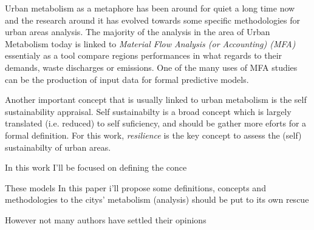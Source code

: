 Urban metabolism as a metaphore has been around for quiet a long time now    
and the research around it has evolved towards some specific methodologies for urban areas analysis.
The majority of the analysis in the area of Urban Metabolism today is 
linked to \emph{Material Flow Analysis (or Accounting) (MFA)}  
essentialy as a tool compare regions performances in what regards to their demands, waste discharges or emissions. 
One of the many uses of MFA studies can be the production of input data for formal predictive models.

Another important concept that is usually linked to urban metabolism is the self sustainability appraisal.
Self sustainabilty is a broad concept which is largely translated (i.e. reduced) to self suficiency, 
and should be gather more eforts for a formal definition. For this work, \emph{resilience} is the key concept
to assess the (self) sustainabilty of urban areas.  

In this work I'll be focused on defining the conce

These models 
In this paper i'll propose some definitions, concepts and methodologies to 
 the citys' metabolism (analysis) should be put to its own rescue 



However not many authors have settled their opinions  
